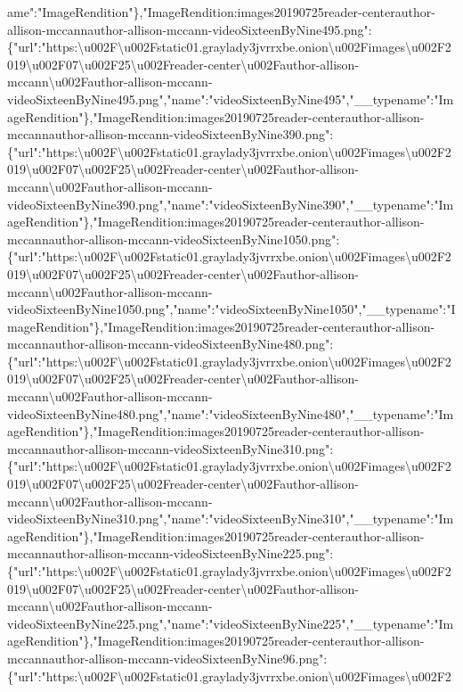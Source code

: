 ame":"ImageRendition"\},"ImageRendition:images20190725reader-centerauthor-allison-mccannauthor-allison-mccann-videoSixteenByNine495.png":\{"url":"https:\textbackslash{}u002F\textbackslash{}u002Fstatic01.graylady3jvrrxbe.onion\textbackslash{}u002Fimages\textbackslash{}u002F2019\textbackslash{}u002F07\textbackslash{}u002F25\textbackslash{}u002Freader-center\textbackslash{}u002Fauthor-allison-mccann\textbackslash{}u002Fauthor-allison-mccann-videoSixteenByNine495.png","name":"videoSixteenByNine495","\_\_typename":"ImageRendition"\},"ImageRendition:images20190725reader-centerauthor-allison-mccannauthor-allison-mccann-videoSixteenByNine390.png":\{"url":"https:\textbackslash{}u002F\textbackslash{}u002Fstatic01.graylady3jvrrxbe.onion\textbackslash{}u002Fimages\textbackslash{}u002F2019\textbackslash{}u002F07\textbackslash{}u002F25\textbackslash{}u002Freader-center\textbackslash{}u002Fauthor-allison-mccann\textbackslash{}u002Fauthor-allison-mccann-videoSixteenByNine390.png","name":"videoSixteenByNine390","\_\_typename":"ImageRendition"\},"ImageRendition:images20190725reader-centerauthor-allison-mccannauthor-allison-mccann-videoSixteenByNine1050.png":\{"url":"https:\textbackslash{}u002F\textbackslash{}u002Fstatic01.graylady3jvrrxbe.onion\textbackslash{}u002Fimages\textbackslash{}u002F2019\textbackslash{}u002F07\textbackslash{}u002F25\textbackslash{}u002Freader-center\textbackslash{}u002Fauthor-allison-mccann\textbackslash{}u002Fauthor-allison-mccann-videoSixteenByNine1050.png","name":"videoSixteenByNine1050","\_\_typename":"ImageRendition"\},"ImageRendition:images20190725reader-centerauthor-allison-mccannauthor-allison-mccann-videoSixteenByNine480.png":\{"url":"https:\textbackslash{}u002F\textbackslash{}u002Fstatic01.graylady3jvrrxbe.onion\textbackslash{}u002Fimages\textbackslash{}u002F2019\textbackslash{}u002F07\textbackslash{}u002F25\textbackslash{}u002Freader-center\textbackslash{}u002Fauthor-allison-mccann\textbackslash{}u002Fauthor-allison-mccann-videoSixteenByNine480.png","name":"videoSixteenByNine480","\_\_typename":"ImageRendition"\},"ImageRendition:images20190725reader-centerauthor-allison-mccannauthor-allison-mccann-videoSixteenByNine310.png":\{"url":"https:\textbackslash{}u002F\textbackslash{}u002Fstatic01.graylady3jvrrxbe.onion\textbackslash{}u002Fimages\textbackslash{}u002F2019\textbackslash{}u002F07\textbackslash{}u002F25\textbackslash{}u002Freader-center\textbackslash{}u002Fauthor-allison-mccann\textbackslash{}u002Fauthor-allison-mccann-videoSixteenByNine310.png","name":"videoSixteenByNine310","\_\_typename":"ImageRendition"\},"ImageRendition:images20190725reader-centerauthor-allison-mccannauthor-allison-mccann-videoSixteenByNine225.png":\{"url":"https:\textbackslash{}u002F\textbackslash{}u002Fstatic01.graylady3jvrrxbe.onion\textbackslash{}u002Fimages\textbackslash{}u002F2019\textbackslash{}u002F07\textbackslash{}u002F25\textbackslash{}u002Freader-center\textbackslash{}u002Fauthor-allison-mccann\textbackslash{}u002Fauthor-allison-mccann-videoSixteenByNine225.png","name":"videoSixteenByNine225","\_\_typename":"ImageRendition"\},"ImageRendition:images20190725reader-centerauthor-allison-mccannauthor-allison-mccann-videoSixteenByNine96.png":\{"url":"https:\textbackslash{}u002F\textbackslash{}u002Fstatic01.graylady3jvrrxbe.onion\textbackslash{}u002Fimages\textbackslash{}u002F2